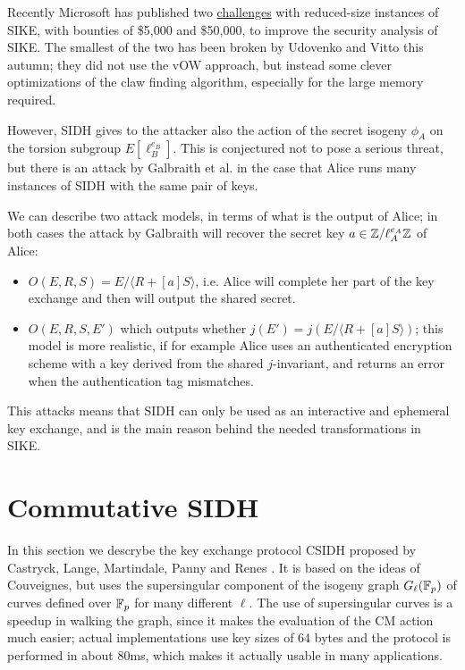 Recently Microsoft has published two \href{https://www.microsoft.com/en-us/msrc/sike-cryptographic-challenge}{challenges} with reduced-size instances of SIKE, with bounties of \$5,000 and \$50,000, to improve the security analysis of SIKE. The smallest of the two has been broken by Udovenko and Vitto \cite{SIKE_challenge} this autumn; they did not use the vOW approach, but instead some clever optimizations of the claw finding algorithm, especially for the large memory required.


However, SIDH gives to the attacker also the action of the secret isogeny $\phi_A$ on the torsion subgroup $E[\ell_B^{e_B}]$. This is conjectured not to pose a serious threat, but there is an attack by Galbraith et al. \cite{Galbraith_SIKE} in the case that Alice runs many instances of SIDH with the same pair of keys.

We can describe two attack models, in terms of what is the output of Alice; in both cases the attack by Galbraith will recover the secret key $a\in\mathbb{Z}/\ell_A^{e_A}\mathbb{Z}$ of Alice:
\begin{itemize}
    \item $O(E,R,S)=E/\langle R+[a]S\rangle$, i.e. Alice will complete her part of the key exchange and then will output the shared secret.
    \item $O(E,R,S,E')$ which outputs whether $j(E')=j(E/\langle R+[a]S\rangle)$; this model is more realistic, if for example Alice uses an authenticated encryption scheme with a key derived from the shared $j$-invariant, and returns an error when the authentication tag mismatches.
\end{itemize}

This attacks means that SIDH can only be used as an interactive and ephemeral key exchange, and is the main reason behind the needed transformations in SIKE.

\section{Commutative SIDH}
In this section we descrybe the key exchange protocol CSIDH proposed by Castryck, Lange, Martindale, Panny and Renes \cite{CSIDH}. It is based on the ideas of Couveignes, but uses the supersingular component of the isogeny graph $G_\ell(\mathbb{F}_p)$ of curves defined over $\mathbb{F}_p$ for many different $\ell$. The use of supersingular curves is a speedup in walking the graph, since it makes the evaluation of the CM action much easier; actual implementations use key sizes of 64 bytes and the protocol is performed in about 80ms, which makes it actually usable in many applications.

